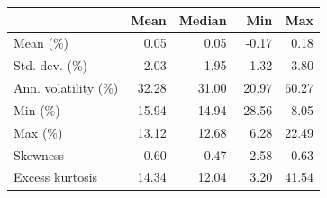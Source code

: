 \begin{tabular}{lrrrr}
\toprule
 & Mean & Median & Min & Max \\
\midrule
Mean (\%) & 0.05 & 0.05 & -0.17 & 0.18 \\
Std. dev. (\%) & 2.03 & 1.95 & 1.32 & 3.80 \\
Ann. volatility (\%) & 32.28 & 31.00 & 20.97 & 60.27 \\
Min (\%) & -15.94 & -14.94 & -28.56 & -8.05 \\
Max (\%) & 13.12 & 12.68 & 6.28 & 22.49 \\
Skewness & -0.60 & -0.47 & -2.58 & 0.63 \\
Excess kurtosis & 14.34 & 12.04 & 3.20 & 41.54 \\
\bottomrule
\end{tabular}
